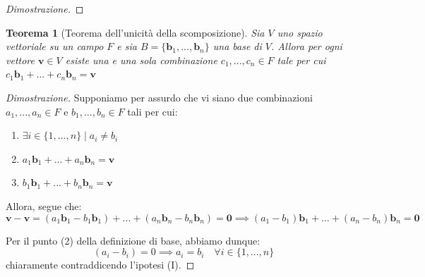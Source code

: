 \documentclass{article}
\newtheorem{theorem}{Teorema}
\begin{document}
\begin{proof}[Dimostrazione]
        \vspace{10pt}

    \end{proof}

    \vspace{10pt}
    \begin{theorem}[Teorema dell'unicità della scomposizione] \label{thm:uniqueness_of_combination}
        Sia $V$ uno spazio vettoriale su un campo $F$ e sia $B = \{\mathbf{b}_{1},...,\mathbf{b}_{n}\}$ una base di $V$. 
        Allora per ogni vettore $\mathbf{v} \in V$ esiste una e una sola combinazione $c_1,...,c_n \in F$ tale per cui $c_1\mathbf{b}_{1} + ... + c_n\mathbf{b}_{n} = \mathbf{v}$
    \end{theorem}

    \begin{proof}[Dimostrazione]
        Supponiamo per assurdo che vi siano due combinazioni $a_1,...,a_n \in F$ e $b_1,...,b_n \in F$ tali per cui: 
        \begin{enumerate}[label=(\Roman*)]
            \item $\exists i \in \{1,...,n\} \; | \; a_i \neq b_i$
            \item $a_1\mathbf{b}_{1} + ... + a_n\mathbf{b}_{n} = \mathbf{v}$ 
            \item $b_1\mathbf{b}_{1} + ... + b_n\mathbf{b}_{n} = \mathbf{v}$ 
        \end{enumerate} 

        Allora, segue che:
        \[
            \mathbf{v} - \mathbf{v} = (a_1\mathbf{b}_{1} - b_1\mathbf{b}_{1}) + ... + (a_n\mathbf{b}_{n} - b_n\mathbf{b}_{n}) = \mathbf{0} \implies (a_1 - b_1) \mathbf{b}_{1} + ... + (a_n - b_n) \mathbf{b}_{n} = \mathbf{0} 
        \]

        Per il punto (2) della definizione di base, abbiamo dunque:
        \[
            (a_i - b_i) = 0 \implies a_i = b_i \quad \forall i \in \{1,...,n\}
        \]
        chiaramente contraddicendo l'ipotesi (I).
    \end{proof}
\end{document}
